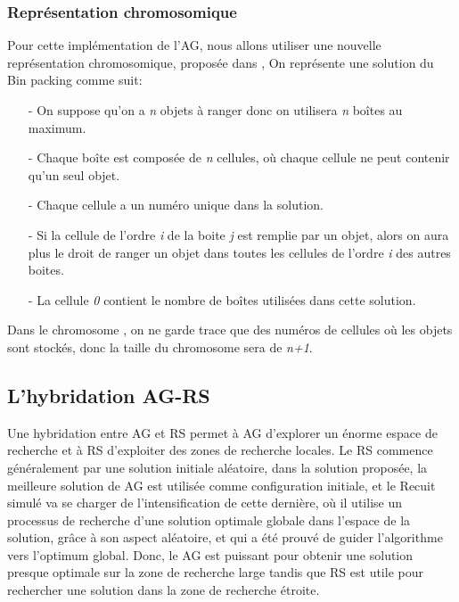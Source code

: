 \documentclass[preprint]{elsarticle}
\begin{document}
\subsubsection{Représentation chromosomique}
Pour cette implémentation de l’AG, nous allons utiliser une nouvelle représentation chromosomique, proposée dans \cite{Mohamadi}, On représente une solution du Bin packing comme suit: 
\begin{itemize}
    \item [-]On suppose qu'on a \emph{n} objets à ranger donc on utilisera \emph{n} boîtes au maximum.
    \item [-]Chaque boîte est composée de  \emph{n} cellules, où chaque cellule ne peut contenir qu’un seul objet.
    \item [-]Chaque cellule a un numéro unique dans la solution.
    \item [-]Si la cellule de l'ordre \emph{i} de la boite \emph{j} est remplie par un objet, alors on aura plus le droit de ranger un objet dans toutes les cellules de l’ordre \emph{i} des autres boites.
    \item [-]La cellule \emph{0} contient le nombre de boîtes utilisées dans cette solution.
\end{itemize}
Dans le chromosome , on ne garde trace que des numéros de cellules où les objets sont stockés, donc la taille du chromosome sera de \emph{n+1}.

\subsection{L'hybridation AG-RS}
Une hybridation entre AG et RS permet à AG d'explorer un énorme espace de recherche et à RS d'exploiter des zones de recherche locales. Le RS commence généralement par une solution initiale aléatoire, dans la solution proposée, la meilleure solution de AG est utilisée comme configuration initiale, et le Recuit simulé va se charger de l’intensification de cette dernière, où il utilise un processus de recherche d'une solution optimale globale dans l'espace de la solution, grâce à son aspect aléatoire, et qui a été prouvé de guider l’algorithme vers l’optimum global. 
Donc, le AG est puissant pour obtenir une solution presque optimale sur la zone de recherche large tandis que RS est utile pour rechercher une solution dans la zone de recherche étroite.\cite{Gusti}
\end{document}
